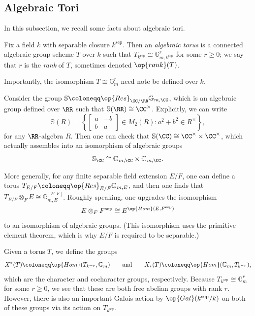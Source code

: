 \documentclass{article}
\begin{document}
\subsection{Algebraic Tori}
In this subsection, we recall some facts about algebraic tori.
\begin{definition}
	Fix a field $k$ with separable closure $k^{\mathrm{sep}}$. Then an \textit{algebraic torus} is a connected algebraic group scheme $T$ over $k$ such that $T_{k^{\mathrm{sep}}}\cong\mathbb G_{m,k^{\mathrm{sep}}}^r$ for some $r\ge0$; we say that $r$ is the \textit{rank} of $T$, sometimes denoted $\op{rank}(T)$.
\end{definition}
\begin{remark}
	Importantly, the isomorphism $T\cong\mathbb G_m^r$ need note be defined over $k$.
\end{remark}
\begin{example}
	Consider the group $\mathbb S\coloneqq\op{Res}_{\CC/\RR}\mathbb G_{m,\CC}$, which is an algebraic group defined over $\RR$ such that $\mathbb S(\RR)\cong\CC^\times$. Explicitly, we can write
	\[\mathbb S(R)=\left\{\begin{bmatrix}
		a & -b \\
		b & a
	\end{bmatrix}\in M_2(R):a^2+b^2\in R^\times\right\},\]
	for any $\RR$-algebra $R$. Then one can check that $\mathbb S(\CC)\cong\CC^\times\times\CC^\times$, which actually assembles into an isomorphism of algebraic groups
	\[\mathbb S_\CC\cong\mathbb G_{m,\CC}\times\mathbb G_{m,\CC}.\]
\end{example}
\begin{example}
	More generally, for any finite separable field extension $E/F$, one can define a torus $T_{E/F}\coloneqq\op{Res}_{E/F}\mathbb G_{m,E}$, and then one finds that $T_{E/F}\otimes_FE\cong\mathbb G_{m,E}^{[E:F]}$. Roughly speaking, one upgrades the isomorphism
	\[E\otimes_FF^{\mathrm{sep}}\cong E^{\op{Hom}(E,F^{\mathrm{sep}})}\]
	to an isomorphism of algebraic groups. (This isomorphism uses the primitive element theorem, which is why $E/F$ is required to be separable.)
\end{example}
Given a torus $T$, we define the groups
\[X^*(T)\coloneqq\op{Hom}(T_{k^{\mathrm{sep}}},\mathbb G_m)\qquad\text{and}\qquad X_*(T)\coloneqq\op{Hom}(\mathbb G_m,T_{k^{\mathrm{sep}}}),\]
which are the character and cocharacter groups, respectively. Because $T_{k^{\mathrm{sep}}}\cong\mathbb G_m^r$ for some $r\ge0$, we see that these are both free abelian groups with rank $r$. However, there is also an important Galois action by $\op{Gal}(k^{\mathrm{sep}}/k)$ on both of these groups via its action on $T_{k^{\mathrm{sep}}}$.
\end{document}

